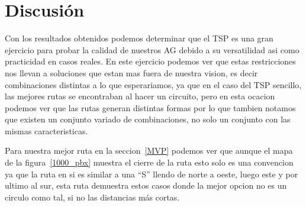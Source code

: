 \section{Discusión}
Con los resultados obtenidos podemos determinar que el TSP es una gran ejercicio para probar la calidad de nuestros AG debido
a su versatilidad asi como practicidad en casos reales. En este ejercicio podemos ver que estas restricciones nos llevan a soluciones
que estan mas fuera de nuestra vision, es decir combinaciones distintas a lo que esperariamos, ya que en el caso del TSP sencillo,
las mejores rutas se encontraban al hacer un circuito, pero en esta ocacion podemos ver que las rutas generan distintas formas por lo
que tambien notamos que existen un conjunto variado de combinaciones, no solo un conjunto con las mismas caracteristicas.

Para nuestra mejor ruta en la seccion~\ref{MVP} podemos ver que aunque el mapa de la figura~\ref{1000_pbx} muestra el cierre de la ruta
esto solo es una convencion ya que la ruta en si es similar a una ``S'' llendo de norte a oeste, luego este y por ultimo al sur, esta
ruta demuestra estos casos donde la mejor opcion no es un circulo como tal, si no las distancias más cortas.